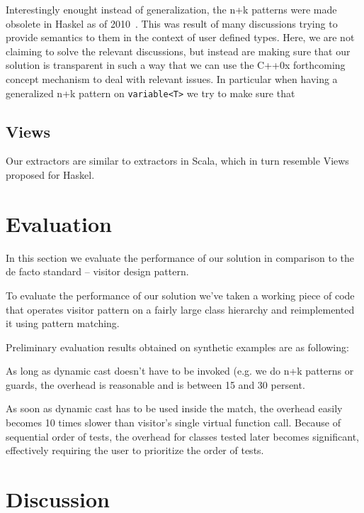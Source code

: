 \documentclass[submission,copyright]{eptcs}
\DeclareRobustCommand{\code}[1]{{\lstinline[breaklines=false]{#1}}}
\begin{document}
Interestingly enought instead of generalization, the n+k patterns were made 
obsolete in Haskel as of 2010~\cite{HaskelDocMakingThis}. This was result of 
many discussions trying to provide semantics to them in the context of user 
defined types. Here, we are not claiming to solve the relevant discussions, but 
instead are making sure that our solution is transparent in such a way that we 
can use the C++0x forthcoming concept mechanism to deal with relevant issues. In 
particular when having a generalized n+k pattern on \code{variable<T>} we try to make 
sure that 

\subsection{Views}

Our extractors are similar to extractors in Scala, which in turn resemble Views 
proposed for Haskel.

\section{Evaluation} %
\label{sec:ev}

In this section we evaluate the performance of our solution in comparison to the 
de facto standard -- visitor design pattern.

To evaluate the performance of our solution we've taken a working piece of code 
that operates visitor pattern on a fairly large class hierarchy and 
reimplemented it using pattern matching.

Preliminary evaluation results obtained on synthetic examples are as following:

As long as dynamic cast doesn't have to be invoked (e.g. we do n+k patterns or 
guards, the overhead is reasonable and is between 15 and 30 persent.

As soon as dynamic cast has to be used inside the match, the overhead easily 
becomes 10 times slower than visitor's single virtual function call. Because of 
sequential order of tests, the overhead for classes tested later becomes 
significant, effectively requiring the user to prioritize the order of tests.

\section{Discussion} %
\end{document}
